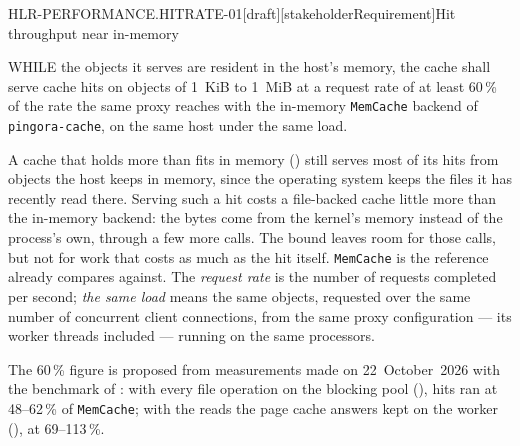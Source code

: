 \begin{requirement}{HLR-PERFORMANCE.HITRATE-01}[draft][stakeholderRequirement]{Hit throughput near in-memory}


  WHILE the objects it serves are resident in the host's memory, the cache
  shall serve cache hits on objects of 1~KiB to 1~MiB at a request rate of at
  least 60\,\% of the rate the same proxy reaches with the in-memory
  \texttt{MemCache} backend of \texttt{pingora-cache}, on the same host under
  the same load.

  A cache that holds more than fits in memory
  () still serves most of its hits from
  objects the host keeps in memory, since the operating system keeps the
  files it has recently read there. Serving such a hit costs a file-backed
  cache little more than the in-memory backend: the bytes come from the
  kernel's memory instead of the process's own, through a few more calls.
  The bound leaves room for those calls, but not for work that costs as much
  as the hit itself. \texttt{MemCache} is the reference
   already compares against. The \emph{request
  rate} is the number of requests completed per second; \emph{the same load}
  means the same objects, requested over the same number of concurrent
  client connections, from the same proxy configuration --- its worker
  threads included --- running on the same processors.

  The 60\,\% figure is proposed from measurements made on 22~October~2026
  with the benchmark of : with every file
  operation on the blocking pool (), hits ran
  at 48--62\,\% of \texttt{MemCache}; with the reads the page cache answers
  kept on the worker (), at 69--113\,\%.


\end{requirement}

